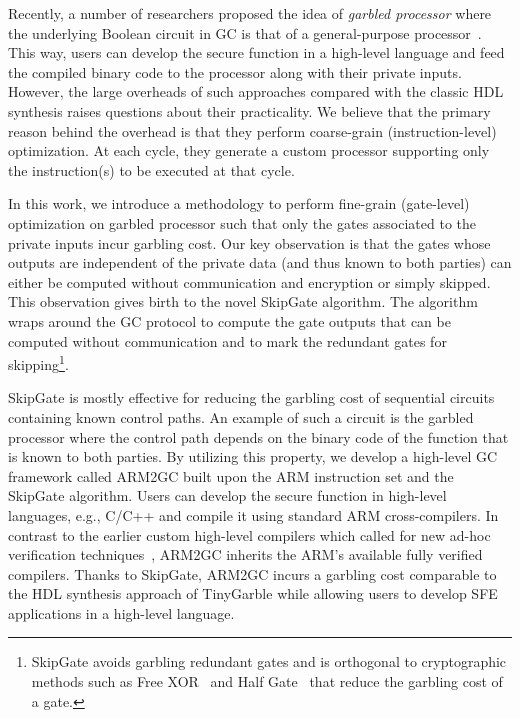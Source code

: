 Recently, a number of researchers proposed the idea of \textit{garbled processor} where the underlying Boolean circuit in GC is that of a general-purpose processor~\cite{wang2016secure, songhori2016garbledcpu}.
This way, users can develop the secure function in a high-level language and feed the compiled binary code to the processor along with their private inputs.
However, the large overheads of such approaches compared with the classic HDL synthesis raises questions about their practicality.
We believe that the primary reason behind the overhead is that they perform coarse-grain (instruction-level) optimization.
At each cycle, they generate a custom processor supporting only the instruction(s) to be executed at that cycle.

In this work, we introduce a methodology to perform fine-grain (gate-level) optimization on garbled processor such that only the gates associated to the private inputs incur garbling cost.
Our key observation is that the gates whose outputs are independent of the private data (and thus known to both parties) can either be computed without communication and encryption or simply skipped.
This observation gives birth to the novel SkipGate algorithm.
The algorithm wraps around the GC protocol to compute the gate outputs that can be computed without communication and to mark the redundant gates for skipping\footnote{SkipGate avoids garbling redundant gates and is orthogonal to cryptographic methods such as Free XOR~\cite{kolesnikov2008improved} and Half Gate~\cite{zahur2015two} that reduce the garbling cost of a gate.}.

SkipGate is mostly effective for reducing the garbling cost of sequential circuits~\cite{songhori2015tinygarble} containing known control paths.
An example of such a circuit is the garbled processor where the control path depends on the binary code of the function that is known to both parties.
By utilizing this property, we develop a high-level GC framework called ARM2GC built upon the ARM instruction set and the SkipGate algorithm.
Users can develop the secure function in high-level languages, e.g., C/C++ and compile it using standard ARM cross-compilers.
In contrast to the earlier custom high-level compilers which called for new ad-hoc verification techniques~\cite{rastogi2014wysteria,demmler2015aby,liu2015oblivm,mood2016frigate}, ARM2GC inherits the ARM's available fully verified compilers.
Thanks to SkipGate, ARM2GC incurs a garbling cost comparable to the HDL synthesis approach of TinyGarble while allowing users to develop SFE applications in a high-level language.

